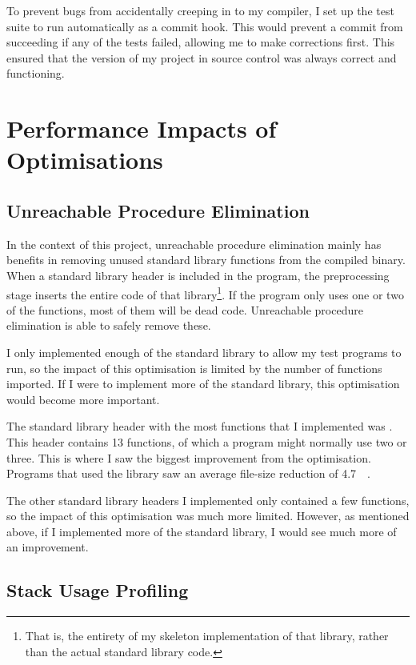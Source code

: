 \documentclass[00-main.tex]{subfiles}
\begin{document}
To prevent bugs from accidentally creeping in to my compiler, I set up the test suite to run automatically as a commit hook. This would prevent a commit from succeeding if any of the tests failed, allowing me to make corrections first.
This ensured that the version of my project in source control was always correct and functioning.




\section{Performance Impacts of Optimisations}

\subsection{Unreachable Procedure Elimination}


In the context of this project, unreachable procedure elimination mainly has benefits in removing unused standard library functions from the compiled binary.
When a standard library header is included in the program, the preprocessing stage inserts the entire code of that library\footnote{That is, the entirety of my skeleton implementation of that library, rather than the actual standard library code.}.
If the program only uses one or two of the functions, most of them will be dead code.
Unreachable procedure elimination is able to safely remove these.

I only implemented enough of the standard library to allow my test programs to run, so the impact of this optimisation is limited by the number of functions imported.
If I were to implement more of the standard library, this optimisation would become more important.

The standard library header with the most functions that I implemented was .
This header contains 13 functions, of which a program might normally use two or three.
This is where I saw the biggest improvement from the optimisation.
Programs that used the  library saw an average file-size reduction of \SI{4.7}{\kilo\byte}.

The other standard library headers I implemented only contained a few functions, so the impact of this optimisation was much more limited. However, as mentioned above, if I implemented more of the standard library, I would see much more of an improvement.

\subsection{Stack Usage Profiling}
\end{document}
